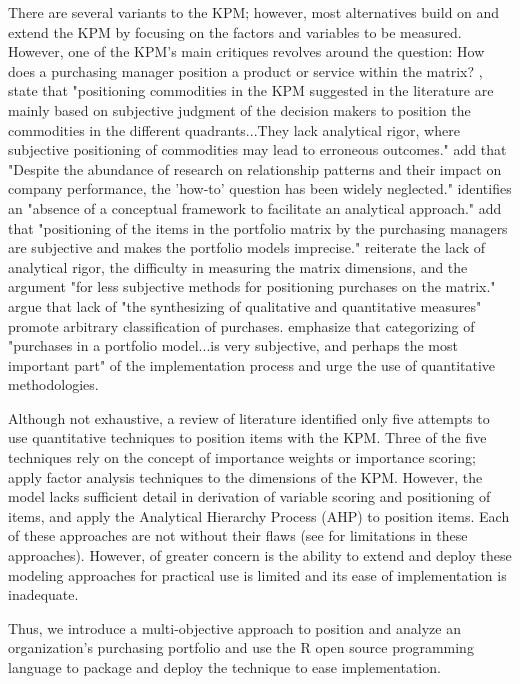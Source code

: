 \documentclass[twocolumn]{svjour3}       %
\begin{document}
There are several variants to the KPM; however, most alternatives build on and extend the KPM by focusing on the factors and variables to be measured.  However, one of the KPM's main critiques revolves around the question: How does a purchasing manager position a product or service within the matrix? \citet{pwa12}, state that "positioning commodities in the KPM suggested in the literature are mainly based on subjective judgment of the decision makers to position the commodities in the different quadrants...They lack analytical rigor, where subjective positioning of commodities may lead to erroneous outcomes." \citet{wj04} add that "Despite the abundance of research on relationship patterns and their impact on company performance, the 'how-to' question has been widely neglected." \citet{r94} identifies an "absence of a conceptual framework to facilitate an analytical approach." \citet{pwa12} add that "positioning of the items in the portfolio matrix by the purchasing managers are subjective and makes the portfolio models imprecise." \citet{ktp14} reiterate the lack of analytical rigor, the difficulty in measuring the matrix dimensions, and the argument "for less subjective methods for positioning purchases on the matrix." \citet{ld10} argue that lack of "the synthesizing of qualitative and quantitative measures" promote arbitrary classification of purchases. \citet{oe97} emphasize that categorizing of "purchases in a portfolio model...is very subjective, and perhaps the most important part" of the implementation process and urge the use of quantitative methodologies.

Although not exhaustive, a review of literature identified only five attempts to use quantitative techniques to position items with the KPM. Three of the five techniques \citep{oe97,lx08,pwa12} rely on the concept of importance weights or importance scoring; \citet{zdl07} apply factor analysis techniques to the dimensions of the KPM. However, the model lacks sufficient detail in derivation of variable scoring and positioning of items, and \citet{ld10} apply the Analytical Hierarchy Process (AHP) to position items. Each of these approaches are not without their flaws (see \citet{dpbhc08, pbtj13, wb87} for limitations in these approaches). However, of greater concern is the ability to extend and deploy these modeling approaches for practical use is limited and its ease of implementation is inadequate. 

Thus, we introduce a multi-objective approach to position and analyze an organization's purchasing portfolio and use the R open source programming language to package and deploy the technique to ease implementation.
\end{document}
